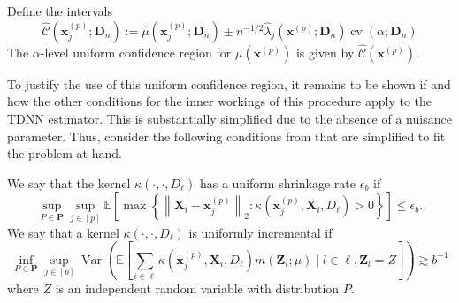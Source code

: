 \documentclass[letterpaper,10pt]{article}
\numberwithin{equation}{section}
\numberwithin{theorem}{section}
\numberwithin{remark}{section}
\numberwithin{example}{section}
\theoremstyle{definition}
\renewcommand{\hat}{\widehat}
\newcommand{\1}{\mathbb{1}}
\begin{document}
\vspace{0.5cm}
\begin{theorem}
	Define the intervals
	\begin{equation}
		\hat{\mathcal{C}}\left(\mathbf{x}^{(p)}_j; \mathbf{D}_n\right)
		:= \hat{\mu}\left(\mathbf{x}^{(p)}_{j}; \mathbf{D}_n\right) \pm
		n^{-1/2} \hat{\lambda}_{j}\left(\mathbf{x}^{(p)}; \mathbf{D}_n\right)\operatorname{cv}\left(\alpha; \mathbf{D}_n\right)
	\end{equation}
	The $\alpha$-level uniform confidence region for $\mu\left(\mathbf{x}^{(p)}\right)$ is given by $\hat{\mathcal{C}}\left(\mathbf{x}^{(p)}\right)$.
\end{theorem}

To justify the use of this uniform confidence region, it remains to be shown if and how the other conditions for the inner workings of this procedure apply to the TDNN estimator.
This is substantially simplified due to the absence of a nuisance parameter.
Thus, consider the following conditions from \cite{ritzwoller_uniform_2024} that are simplified to fit the problem at hand.

\vspace{0.5cm}
\begin{definition}
	We say that the kernel $\kappa\left(\cdot, \cdot, D_{\ell}\right)$ has a uniform shrinkage rate $\epsilon_b$ if
	\begin{equation}
		\sup_{P \in \mathbf{P}} \sup_{j \in[p]}
		\mathbb{E}\left[\max \left\{\left\|\mathbf{X}_i-\mathbf{x}^{(p)}_{j}\right\|_{2}: \kappa\left(\mathbf{x}^{(p)}_{j}, \mathbf{X}_i, D_{\ell}\right)>0\right\}\right]
		\leq \epsilon_b .
	\end{equation}
	We say that a kernel $\kappa\left(\cdot, \cdot, D_{\ell}\right)$ is uniformly incremental if
	\begin{equation}
		\inf_{P \in \mathbf{P}} \sup_{j \in[p]}
		\operatorname{Var}\left(\mathbb{E}\left[\sum_{i \in \ell} \kappa\left(\mathbf{x}^{(p)}_{j}, \mathbf{X}_i, D_{\ell}\right) m\left(\mathbf{Z}_i ; \mu\right) \mid l \in \ell, \mathbf{Z}_l = Z\right]\right)
		\gtrsim b^{-1}
	\end{equation}
	where $Z$ is an independent random variable with distribution $P$.
\end{definition}
\end{document}
